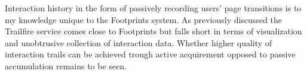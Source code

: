 \documentclass[12pt,a4paper]{article}
\begin{document}
Interaction history in the form of passively recording users' page transitions
is to my knowledge unique to the Footprints system. As previously discussed
the Trailfire service comes close to Footprints but falls short in terms of
visualization and unobtrusive collection of interaction data. Whether higher
quality of interaction trails can be achieved trough active acquirement
opposed to passive accumulation remains to be seen.

\section{}




\end{document}
